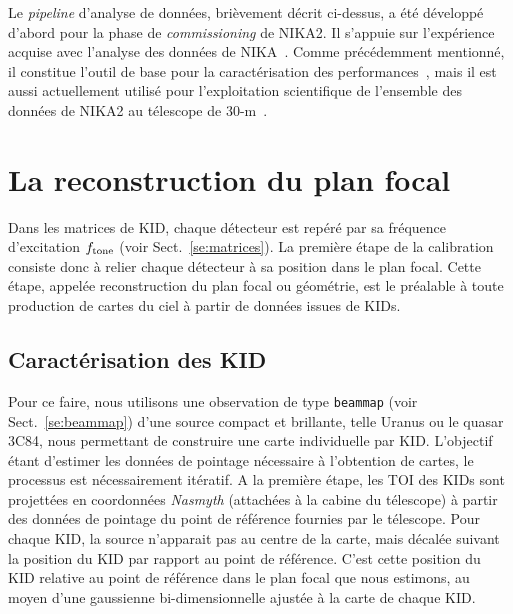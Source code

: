 Le \emph{pipeline} d'analyse de données, brièvement décrit
ci-dessus, a été développé d'abord pour la phase de
\emph{commissioning} de NIKA2. Il s'appuie sur l'expérience acquise
avec l'analyse des données de NIKA~\citep{Catalano2014,
  Adam2014}. Comme précédemment mentionné, il constitue l'outil de
base pour la caractérisation des
performances~\citep{Adam2018, Perotto2019, Ponthieu2020}, mais il est
aussi actuellement utilisé pour l'exploitation scientifique de
l'ensemble des données de NIKA2 au télescope de
30-m~\citep{Ruppin2018, Ruppin2019c}.  


%
%
\section{La reconstruction du plan focal}
\label{se:fov_geometry}

Dans les matrices de KID, chaque détecteur est repéré par sa fréquence
d'excitation $f_{\rm{tone}}$ (voir Sect.~\ref{se:matrices}). La
première étape de la calibration consiste donc à relier chaque
détecteur à sa position dans le plan focal. Cette
étape, appelée reconstruction du plan focal ou géométrie, est le
préalable à toute production de cartes du ciel à partir de données
issues de KIDs.

\subsection{Caractérisation des KID}

Pour ce faire, nous utilisons une observation de type {\tt beammap}
(voir Sect.~\ref{se:beammap}) d'une source compact et brillante, telle
Uranus ou le quasar 3C84, nous permettant de construire une carte
individuelle par KID. L'objectif étant d'estimer les données de
pointage nécessaire à l'obtention de cartes, le processus est
nécessairement itératif. A la première étape, les TOI des KIDs sont
projettées en coordonnées \emph{Nasmyth} (attachées à la cabine du
télescope) à partir des données de pointage du point de référence
fournies par le télescope. Pour chaque KID, la source n'apparait pas
au centre de la carte, mais décalée suivant la position du KID par
rapport au point de référence. C'est cette position du KID relative au
point de référence dans le plan focal que nous estimons, au moyen d'une
gaussienne bi-dimensionnelle ajustée à la carte de chaque KID. 

